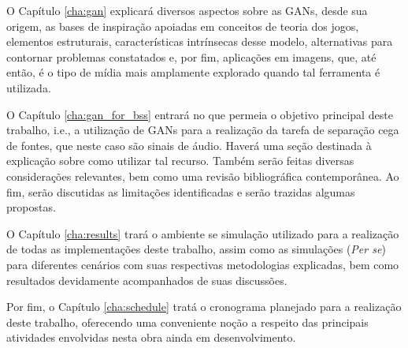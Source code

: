 O Capítulo \ref{cha:gan} explicará diversos aspectos sobre as GANs, desde sua origem, as bases de inspiração apoiadas em conceitos de teoria dos jogos, elementos estruturais, características intrínsecas desse modelo, alternativas para contornar problemas constatados e, por fim, aplicações em imagens, que, até então, é o tipo de mídia mais amplamente explorado quando tal ferramenta é utilizada.

O Capítulo \ref{cha:gan_for_bss} entrará no que permeia o objetivo principal deste trabalho, i.e., a utilização de GANs para a realização da tarefa de separação cega de fontes, que neste caso são sinais de áudio. Haverá uma seção destinada à explicação sobre como utilizar tal recurso. Também serão feitas diversas considerações relevantes, bem como uma revisão bibliográfica contemporânea. Ao fim, serão discutidas as limitações identificadas e serão trazidas algumas propostas.

O Capítulo \ref{cha:results} trará o ambiente se simulação utilizado para a realização de todas as implementações deste trabalho, assim como as simulações (\textit{Per se}) para diferentes cenários com suas respectivas metodologias explicadas, bem como resultados devidamente acompanhados de suas discussões.


Por fim, o Capítulo \ref{cha:schedule} tratá o cronograma planejado para a realização deste trabalho, oferecendo uma conveniente noção a respeito das principais atividades envolvidas nesta obra ainda em desenvolvimento.